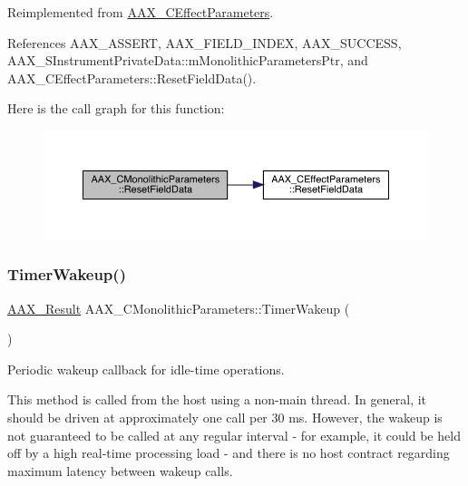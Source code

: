 Reimplemented from \mbox{\hyperlink{a01481_a0dd675680a657de7f9d45d65d4b3bcfb}{A\+A\+X\+\_\+\+C\+Effect\+Parameters}}.



References A\+A\+X\+\_\+\+A\+S\+S\+E\+RT, A\+A\+X\+\_\+\+F\+I\+E\+L\+D\+\_\+\+I\+N\+D\+EX, A\+A\+X\+\_\+\+S\+U\+C\+C\+E\+SS, A\+A\+X\+\_\+\+S\+Instrument\+Private\+Data\+::m\+Monolithic\+Parameters\+Ptr, and A\+A\+X\+\_\+\+C\+Effect\+Parameters\+::\+Reset\+Field\+Data().

Here is the call graph for this function\+:
\nopagebreak
\begin{figure}[H]
\begin{center}
\leavevmode
\includegraphics[width=350pt]{a01969_a43db72446afba852f68d19d92c2aa05b_cgraph}
\end{center}
\end{figure}
\mbox{\label{a01969_ac3f92841efe2d864ffefce94b7ae27b4}} 
\subsubsection{\texorpdfstring{TimerWakeup()}{TimerWakeup()}}
{\footnotesize\ttfamily \mbox{\hyperlink{a00392_a4d8f69a697df7f70c3a8e9b8ee130d2f}{A\+A\+X\+\_\+\+Result}} A\+A\+X\+\_\+\+C\+Monolithic\+Parameters\+::\+Timer\+Wakeup (\begin{DoxyParamCaption}{ }\end{DoxyParamCaption})\hspace{0.3cm}{\ttfamily [virtual]}}



Periodic wakeup callback for idle-\/time operations. 

This method is called from the host using a non-\/main thread. In general, it should be driven at approximately one call per 30 ms. However, the wakeup is not guaranteed to be called at any regular interval -\/ for example, it could be held off by a high real-\/time processing load -\/ and there is no host contract regarding maximum latency between wakeup calls.

